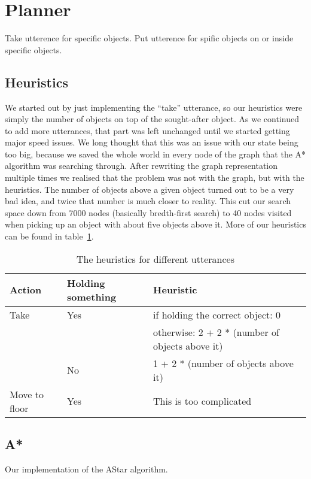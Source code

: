 \section*{Planner}
Take utterence for specific objects.
Put utterence for spific objects on or inside specific objects.

\subsection*{Heuristics}
We started out by just implementing the ``take'' utterance, so our heuristics
were simply the number of objects on top of the sought-after object.  As we
continued to add more utterances, that part was left unchanged until we started
getting major speed issues. We long thought that this was an issue with our
state being too big, because we saved the whole world in every node of the
graph that the A* algorithm was searching through. After rewriting the graph
representation multiple times we realised that the problem was not with the
graph, but with the heuristics. The number of objects above a given object
turned out to be a very bad idea, and twice that number is much closer to
reality. This cut our search space down from 7000 nodes (basically bredth-first
search) to 40 nodes visited when picking up an object with about five objects
above it. More of our heuristics can be found in table~\ref{tab:heuristics}.

\begin{table}[h]
    \begin{tabular}{|l|l|l|}
    \hline
    Action        & Holding something & Heuristic                      \\ \hline
    Take          & Yes               & if holding the correct object: 0\\
                  &                   & otherwise: 2 + 2 *
                                        (number of objects above it)   \\ \hline
                  & No                & 1 + 2 * (number of objects
                                        above it)                      \\ \hline
    Move to floor & Yes               & This is too complicated        \\ \hline
    \end{tabular}
    \caption{The heuristics for different utterances}
\label{tab:heuristics}
\end{table}

\subsection*{A*}
Our implementation of the AStar algorithm.


